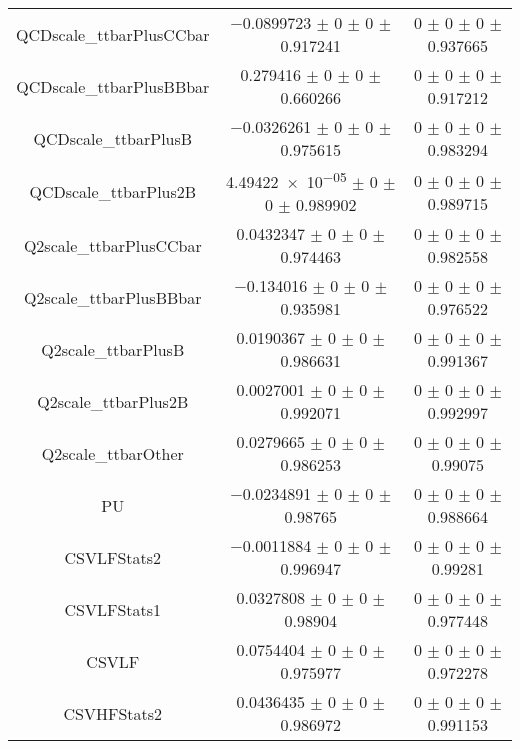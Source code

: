 \begin{table}
\begin{tabular}{ccc}
QCDscale\_ttbarPlusCCbar & \num{-0.0899723} $\pm$ \num{0} $\pm$ \num{0} $\pm$ \num{0.917241} & \num{0} $\pm$ \num{0} $\pm$ \num{0} $\pm$ \num{0.937665}\\
QCDscale\_ttbarPlusBBbar & \num{0.279416} $\pm$ \num{0} $\pm$ \num{0} $\pm$ \num{0.660266} & \num{0} $\pm$ \num{0} $\pm$ \num{0} $\pm$ \num{0.917212}\\
QCDscale\_ttbarPlusB & \num{-0.0326261} $\pm$ \num{0} $\pm$ \num{0} $\pm$ \num{0.975615} & \num{0} $\pm$ \num{0} $\pm$ \num{0} $\pm$ \num{0.983294}\\
QCDscale\_ttbarPlus2B & \num{4.49422e-05} $\pm$ \num{0} $\pm$ \num{0} $\pm$ \num{0.989902} & \num{0} $\pm$ \num{0} $\pm$ \num{0} $\pm$ \num{0.989715}\\
Q2scale\_ttbarPlusCCbar & \num{0.0432347} $\pm$ \num{0} $\pm$ \num{0} $\pm$ \num{0.974463} & \num{0} $\pm$ \num{0} $\pm$ \num{0} $\pm$ \num{0.982558}\\
Q2scale\_ttbarPlusBBbar & \num{-0.134016} $\pm$ \num{0} $\pm$ \num{0} $\pm$ \num{0.935981} & \num{0} $\pm$ \num{0} $\pm$ \num{0} $\pm$ \num{0.976522}\\
Q2scale\_ttbarPlusB & \num{0.0190367} $\pm$ \num{0} $\pm$ \num{0} $\pm$ \num{0.986631} & \num{0} $\pm$ \num{0} $\pm$ \num{0} $\pm$ \num{0.991367}\\
Q2scale\_ttbarPlus2B & \num{0.0027001} $\pm$ \num{0} $\pm$ \num{0} $\pm$ \num{0.992071} & \num{0} $\pm$ \num{0} $\pm$ \num{0} $\pm$ \num{0.992997}\\
Q2scale\_ttbarOther & \num{0.0279665} $\pm$ \num{0} $\pm$ \num{0} $\pm$ \num{0.986253} & \num{0} $\pm$ \num{0} $\pm$ \num{0} $\pm$ \num{0.99075}\\
PU & \num{-0.0234891} $\pm$ \num{0} $\pm$ \num{0} $\pm$ \num{0.98765} & \num{0} $\pm$ \num{0} $\pm$ \num{0} $\pm$ \num{0.988664}\\
CSVLFStats2 & \num{-0.0011884} $\pm$ \num{0} $\pm$ \num{0} $\pm$ \num{0.996947} & \num{0} $\pm$ \num{0} $\pm$ \num{0} $\pm$ \num{0.99281}\\
CSVLFStats1 & \num{0.0327808} $\pm$ \num{0} $\pm$ \num{0} $\pm$ \num{0.98904} & \num{0} $\pm$ \num{0} $\pm$ \num{0} $\pm$ \num{0.977448}\\
CSVLF & \num{0.0754404} $\pm$ \num{0} $\pm$ \num{0} $\pm$ \num{0.975977} & \num{0} $\pm$ \num{0} $\pm$ \num{0} $\pm$ \num{0.972278}\\
CSVHFStats2 & \num{0.0436435} $\pm$ \num{0} $\pm$ \num{0} $\pm$ \num{0.986972} & \num{0} $\pm$ \num{0} $\pm$ \num{0} $\pm$ \num{0.991153}\\

\end{tabular}
\end{table}
